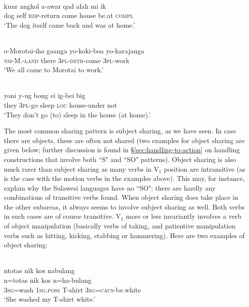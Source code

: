 \ea 
{}\\
\gll kuur angkol a-awar qad alah mi ik \\
dog self \textsc{rdp}-return come house be.at \textsc{compl} \\
\glft `The dog itself came back and was at home.'\\ 
\z

\ea \label{tobelo001}
\\
\gll o-Morotai-iha gaanga yo-koki-boa yo-karajanga \\
\textsc{nm}-M.-\textsc{land} there 3\textsc{pl}-\textsc{dstr}-come 3\textsc{pl}-work \\
\glft `We all came to Morotai to work.'\\
\z

\ea 
{}\\
\gll yoni y-ug bong ei ig-bei big \\
they 3\textsc{pl}-go sleep \textsc{loc} house-under not \\
\glft `They don't go (to) sleep in the house (at home).'\\ 
\z

The most common sharing pattern is subject sharing, as we have seen. In case there are objects, these are often not shared (two examples for object sharing are given below; further discussion is found in §\ref{sec:handling-to-action} on handling constructions that involve both ``S" and ``SO" patterns). Object sharing is also much rarer than subject sharing as many verbs in V$_1$ position are intransitive (as is the case with the motion verbs in the examples above). This may, for instance, explain why the Sulawesi languages have no ``SO": there are hardly any combinations of transitive verbs found. When object sharing does take place in the other subareas, it always seems to involve subject sharing as well. Both verbs in such cases are of course transitive. V$_1$ more or less invariantly involves a verb of object manipulation (basically verbs of taking, and patientive manipulation verbs such as hitting, kicking, stabbing or hammering). Here are two examples of object sharing:

\ea \label{taba001}
\\
\glll ntotas nik kos nabulang \\
n=totas nik kos n=ha-bulang \\
3\textsc{sg}=wash 1\textsc{sg}.\textsc{poss} T-shirt 3\textsc{sg}=\textsc{caus}-be.white \\
\glft `She washed my T-shirt white.'\\ 
\z

